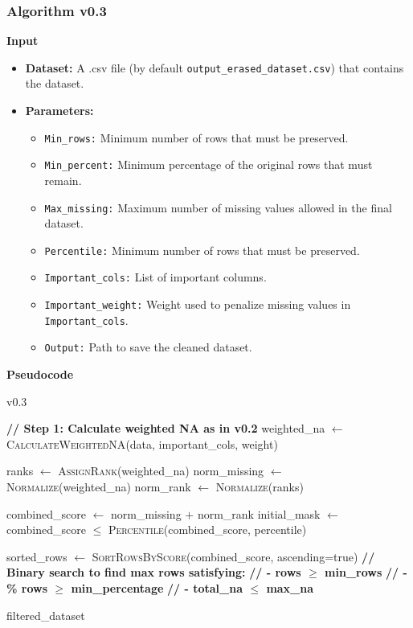 \documentclass[a4paper,12pt]{article}
\begin{document}

\subsubsection{Algorithm v0.3}
\textbf{Input}
\begin{itemize}
    \item \textbf{Dataset:} A .csv file (by default \texttt{output\_erased\_dataset.csv}) that contains the dataset.
    \item \textbf{Parameters:}
    \begin{itemize}
        \item \texttt{Min\_rows:} Minimum number of rows that must be preserved.
        \item \texttt{Min\_percent:} Minimum percentage of the original rows that must remain.
        \item \texttt{Max\_missing:} Maximum number of missing values allowed in the final dataset.
        \item \texttt{Percentile:} Minimum number of rows that must be preserved.
        \item \texttt{Important\_cols:} List of important columns.
        \item \texttt{Important\_weight:} Weight used to penalize missing values in \texttt{Important\_cols}.
        \item \texttt{Output:} Path to save the cleaned dataset.
    \end{itemize}
\end{itemize}


\textbf{Pseudocode}
\begin{algorithm}[H]
\caption{v0.3}
\begin{algorithmic}[1]
    \State \textbf{// Step 1: Calculate weighted NA as in v0.2}
    \State weighted\_na $\gets$ \textsc{CalculateWeightedNA}(data, important\_cols, weight)
    
    \State ranks $\gets$ \textsc{AssignRank}(weighted\_na) 
    \State norm\_missing $\gets$ \textsc{Normalize}(weighted\_na) 
    \State norm\_rank $\gets$ \textsc{Normalize}(ranks) 
    
    \State combined\_score $\gets$ norm\_missing $+$ norm\_rank
    \State initial\_mask $\gets$ combined\_score $\leq$ \textsc{Percentile}(combined\_score, percentile)
    
        \State sorted\_rows $\gets$ \textsc{SortRowsByScore}(combined\_score, ascending=true)
        \State \textbf{// Binary search to find max rows satisfying:}
        \State \textbf{// - rows $\geq$ min\_rows}
        \State \textbf{// - \% rows $\geq$ min\_percentage}
        \State \textbf{// - total\_na $\leq$ max\_na}
    \EndIf
    
    \State \Return filtered\_dataset
\EndFunction
\end{algorithmic}
\end{algorithm}
\end{document}
